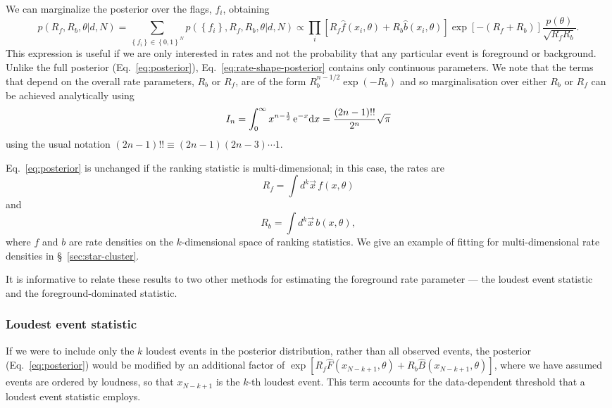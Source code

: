 \documentclass[aps,prd]{revtex4-1}
\newcommand{\mathset}[1]{\left\{ #1 \right\}}
\begin{document}
We can marginalize the posterior over the flags, $f_i$, obtaining
\begin{equation}
  \label{eq:rate-shape-posterior}
  p\left( R_f, R_b, \theta | d, N \right) = \sum_{\mathset{f_i} \in
    \mathset{0,1}^N} p\left( \mathset{f_i}, R_f, R_b, \theta | d, N
  \right) \propto \prod_{i} \left[ R_f \hat{f}\left(x_i, \theta\right)
    + R_b \hat{b}\left( x_i, \theta\right) \right] \exp\left[-\left(
    R_f + R_b \right) \right] \frac{p(\theta)}{\sqrt{R_f R_b}}.
\end{equation}
This expression is useful if we are only interested in rates and not
the probability that any particular event is foreground or background.
Unlike the full posterior (Eq.~\eqref{eq:posterior}),
Eq.~\eqref{eq:rate-shape-posterior} contains only continuous
parameters. We note that the terms that depend on the overall rate
parameters, $R_b$ or $R_f$, are of the form $R_b^{n-1/2} \exp(-R_b)$
and so marginalisation over either $R_b$ or $R_f$ can be achieved
analytically using
\begin{equation}
I_n = \int_0^{\infty} x^{n-\frac{1}{2}} \, {\rm e}^{-x} {\rm d} x =
\frac{(2n-1)!!}{2^n} \sqrt{\pi}
\end{equation}
using the usual notation $(2n-1)!! \equiv (2n-1)(2n-3)\cdots1$.

Eq.~\eqref{eq:posterior} is unchanged if the ranking statistic is
multi-dimensional; in this case, the rates are
\begin{equation}
  R_f = \int d^k \vec{x} \, f(x, \theta)
\end{equation}
and
\begin{equation}
  R_b = \int d^k \vec{x} \, b(x, \theta),
\end{equation}
where $f$ and $b$ are rate densities on the $k$-dimensional space of
ranking statistics.  We give an example of fitting for
multi-dimensional rate densities in \S~\ref{sec:star-cluster}.

It is informative to relate these results to two other methods for
estimating the foreground rate parameter --- the loudest event statistic
and the foreground-dominated statistic.

\subsubsection{Loudest event statistic}
If we were to include only the $k$ loudest events in the posterior
distribution, rather than all observed events, the posterior
(Eq.~\eqref{eq:posterior}) would be modified by an additional factor
of $\exp[R_f \hat{F}(x_{N-k+1},\theta) + R_b
  \hat{B}(x_{N-k+1},\theta)]$, where we have assumed events are
ordered by loudness, so that $x_{N-k+1}$ is the $k$-th loudest
event. This term accounts for the data-dependent threshold that a
loudest event statistic employs.
\end{document}

